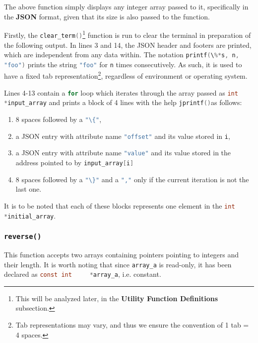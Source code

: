 \documentclass{article}
\newcommand{\code}[1]{\lstinline[language=C]!#1!}
\begin{document}
	

	The above function simply displays any integer array passed to it, specifically in the \textbf{JSON}
	format, given that its size is also passed to the function. 

	Firstly, the \code{clear_term()}\footnote{This will be analyzed later, in the \textbf{Utility
	Function Definitions} subsection.} function is run to clear the terminal in preparation of the
	following output. In lines 3 and 14, the JSON header and footers are printed, which are
	independent from any data within. The notation \code{printf(\%*s, n, "foo")} prints the string
	\code{"foo"} for \code{n} times consecutively. As such, it is used to have a fixed tab
	representation\footnote{Tab representations may vary, and thus we ensure the convention of
	1 tab = 4 spaces.}, regardless of environment or operating system.

	Lines 4-13 contain a \code{for} loop which iterates through the array passed as \code{int 
	*input_array} and prints a block of 4 lines with the help \code{jprintf()}\footnotemark[1] as
	follows: 

	\begin{enumerate}
		\item 8 spaces followed by a \code{"\{"},
		\item a JSON entry with attribute name \code{"offset"} and its value stored in \code{i},
		\item a JSON entry with attribute name \code{"value"} and its value stored in the address
			pointed to by \code{input_array[i]}
		\item 8 spaces followed by a \code{"\}"} and a \code{","} only if the current iteration is not the last one.
	\end{enumerate}

	It is to be noted that each of these blocks represents one element in the \code{int *initial_array}.

	\newpage

	\subsubsection{\texttt{reverse()}}

	

	This function accepts two arrays containing pointers pointing to integers and their length. It is
	worth noting that since \code{array_a} is read-only, it has been declared as \code{const int
	*array_a}, i.e. constant.
\end{document}
